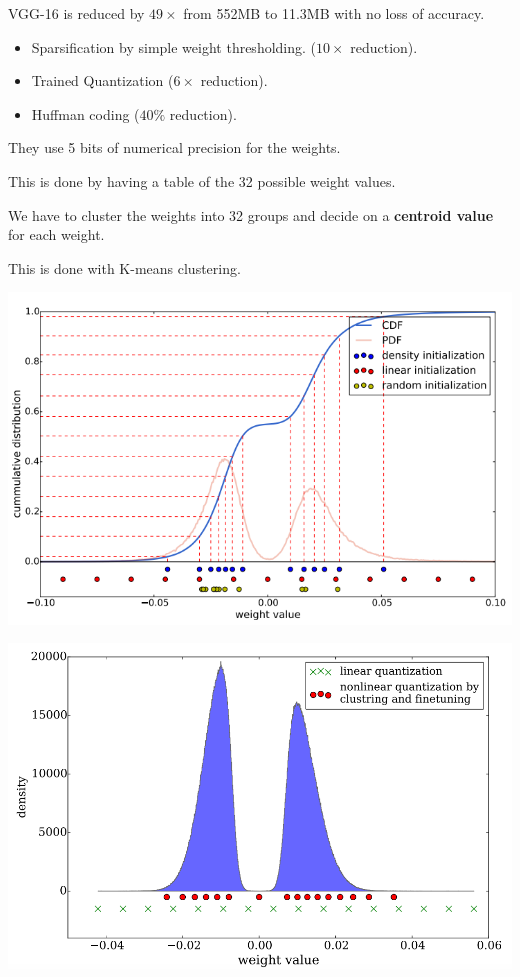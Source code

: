 {\vfill
VGG-16 is reduced by $49 \times$ from 552MB to 11.3MB with no loss of accuracy.


\begin{itemize}
\item Sparsification by simple weight thresholding.  ($10 \times$ reduction).

  \vfill
\item Trained Quantization ($6\times$ reduction).

  \vfill
\item Huffman coding ($40\%$ reduction).
\end{itemize}


They use 5 bits of numerical precision for the weights.

\vfill
This is done by having a table of the 32 possible weight values.

\vfill
We have to cluster the weights into 32 groups and decide on a {\bf centroid value} for each weight.

\vfill
This is done with K-means clustering.


\centerline{\includegraphics[width = 7in]{../images/Compression1}}


\centerline{\includegraphics[width = 7in]{../images/Compression2}}

}
